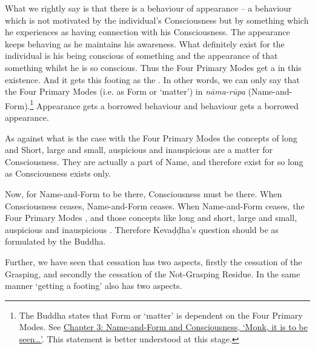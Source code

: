 What we  rightly say is that there is a behaviour of appearance -- a behaviour which is not motivated by the individual's Consciousness but by something which he experiences as having  connection with his Consciousness. The appearance keeps behaving as he maintains his awareness. What  definitely exist for the individual is his being conscious of something and the appearance of that something whilst he is so conscious. Thus the Four Primary Modes get a  in this existence. And it gets this footing as the . In other words, we can only say that the Four Primary Modes  (i.e. as Form or `matter') in \emph{nāma-rūpa} (Name-and-Form).\footnote{The Buddha states that Form or `matter' is dependent on the Four Primary Modes. See \href{ch-03-name-and-form-and-consciousness.xml\#dependent}{Chapter 3: Name-and-Form and Consciousness, `Monk, it is to be seen\ldots\hspace{0pt}'}. This statement is better understood at this stage.} Appearance gets a borrowed behaviour and behaviour gets a borrowed appearance.

As against what is the case with the Four Primary Modes the concepts of long and Short, large and small, auspicious and inauspicious are  a matter for Consciousness. They are actually a part of Name, and therefore exist for so long as Consciousness exists only.

Now, for Name-and-Form to be there, Consciousness must be there. When Consciousness ceases, Name-and-Form ceases. When Name-and-Form ceases, the Four Primary Modes , and those concepts like long and short, large and small, auspicious and inauspicious . Therefore Kevaḍḍha's question should be as formulated by the Buddha.

Further, we have seen that cessation has two aspects, firstly the cessation of the Grasping, and secondly the cessation of the Not-Grasping Residue. In the same manner `getting a footing' also has two aspects.

